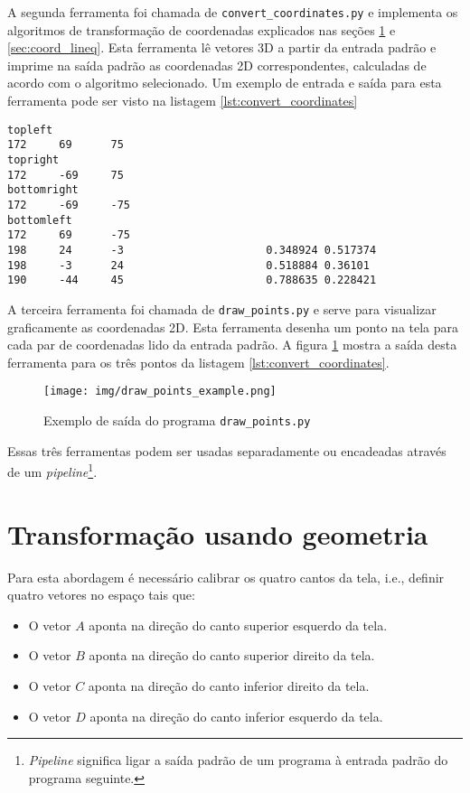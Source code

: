 \documentclass[brazil,pagestart=firstchapter]{abnt}
\makeatletter
\newcommand*{\ie}{i.e.\@\xspace}
\makeatother
\begin{document}
A segunda ferramenta foi chamada de \texttt{convert\_coordinates.py} e
implementa os algoritmos de transformação de coordenadas explicados nas
seções \ref{sec:coord_geometria} e \ref{sec:coord_lineq}. Esta ferramenta
lê vetores 3D a partir da entrada padrão e imprime na saída padrão as
coordenadas 2D correspondentes, calculadas de acordo com o algoritmo
selecionado. Um exemplo de entrada e saída para esta ferramenta pode ser
visto na listagem \ref{lst:convert_coordinates}

\begin{lstlisting}[numbers=none, float=h, label={lst:convert_coordinates},
caption={Entrada para o programa \texttt{convert\_coordinates.py} e a saída correspondente}
]
topleft
172     69      75
topright
172     -69     75
bottomright
172     -69     -75
bottomleft
172     69      -75
198     24      -3                      0.348924 0.517374
198     -3      24                      0.518884 0.36101
190     -44     45                      0.788635 0.228421
\end{lstlisting}

A terceira ferramenta foi chamada de \texttt{draw\_points.py} e serve para
visualizar graficamente as coordenadas 2D. Esta ferramenta desenha um ponto
na tela para cada par de coordenadas lido da entrada padrão. A figura
\ref{fig:draw_points} mostra a saída desta ferramenta para os três pontos da
listagem \ref{lst:convert_coordinates}.

\begin{figure}[h]
\centering
\texttt{[image: img/draw\_points\_example.png]}
\caption{Exemplo de saída do programa \texttt{draw\_points.py}}
\label{fig:draw_points}
\end{figure}

Essas três ferramentas podem ser usadas separadamente ou encadeadas através
de um \textit{pipeline}\footnote{
	\textit{Pipeline} significa ligar a saída padrão de um programa à
	entrada padrão do programa seguinte.
}.


\section{Transformação usando geometria}
\label{sec:coord_geometria}

Para esta abordagem é necessário calibrar os quatro cantos da tela, \ie,
definir quatro vetores no espaço tais que:

\begin{itemize}
\item O vetor $A$ aponta na direção do canto superior esquerdo da tela.
\item O vetor $B$ aponta na direção do canto superior direito da tela.
\item O vetor $C$ aponta na direção do canto inferior direito da tela.
\item O vetor $D$ aponta na direção do canto inferior esquerdo da tela.
\end{itemize}
\end{document}
